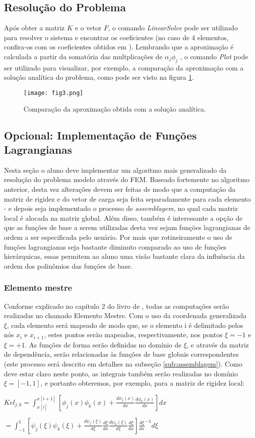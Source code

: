 \documentclass[11pt, oneside, hidelinks]{article}   	%
\begin{document}
\subsection{Resolução do Problema}
Após obter a matriz $K$ e o vetor $F$, o comando \emph{LinearSolve} pode ser utilizado para resolver o sistema e encontrar os coeficientes (no caso de 4 elementos, confira-os com os coeficientes obtidos em \citet{oden81}). Lembrando que a aproximação é calculada a partir da somatória das multplicações de $\alpha_{j}\phi_{j}$ , o comando \emph{Plot} pode ser utilizado para visualizar, por exemplo, a comparação da aproximação com a solução analítica do problema, como pode ser visto na figura \ref{fig:plotmath1}.
\begin{figure}[h!]
  \centering
      \texttt{[image: fig3.png]}
  \caption{Comparação da aproximação obtida com a solução analítica.}
  \label{fig:plotmath1}
\end{figure}

\subsection{Opcional: Implementação de Funções Lagrangianas}
\label{sub:math2}
Nesta seção o aluno deve implementar um algoritmo mais generalizado da resolução do problema modelo através do FEM. Baseado fortemente no algoritmo anterior, desta vez alterações devem ser feitas de modo que a computação da matriz de rigidez e do vetor de carga seja feita separadamente para cada elemento - e depois seja implementado o processo de \emph{assemblagem}, no qual cada matriz local é alocada na matriz global. Além disso, também é interessante a opção de que as funções de base a serem utilizadas desta vez sejam funções lagrangianas de ordem a ser especificada pelo usuário. Por mais que rotineiramente o uso de funções lagrangianas seja bastante diminuto comparado ao uso de funções hierárquicas, essas permitem ao aluno uma visão bastante clara da influência da ordem dos polinômios das funções de base.
\subsubsection{Elemento mestre}
Conforme explicado no capítulo 2 do livro de \citet{oden81}, todas as computações serão realizadas no chamado Elemento Mestre. Com o uso da coordenada generalizada $\xi$, cada elemento será mapeado de modo que, se o elemento i é delimitado pelos nós $x_{i}$ e $x_{i+1}$, estes pontos serão mapeados, respectivamente, nos pontos $\xi=-1$ e $\xi=+1$. As funções de forma serão definidas no domínio de $\xi$, e através da matriz de dependência, serão relacionadas às funções de base globais correspondentes (este processo será descrito em detalhes na subseção \ref{sub:assemblagem}). Como deve estar claro neste ponto, as integrais também serão realizadas no domínio $\xi=[-1,1]$, e portanto obteremos, por exemplo, para a matriz de rigidez local:
\centerline{$Kel_{j,k}=\int_{x[i]}^{x[i+1]}[\phi_{j}(x)\phi_{k}(x)+\frac{d\phi_{j}(x)}{dx}\frac{d\phi_{k}(x)}{dx}]dx$}
\centerline{$=\int_{-1}^{1}[\psi_{j}(\xi)\psi_{k}(\xi)+\frac{d\psi_{j}(\xi)}{d\xi}\frac{d\xi}{dx}\frac{d\psi_{k}(\xi)}{d\xi}\frac{d\xi}{dx}]\frac{d\xi}{dx}^{-1}d\xi$}
\end{document}
